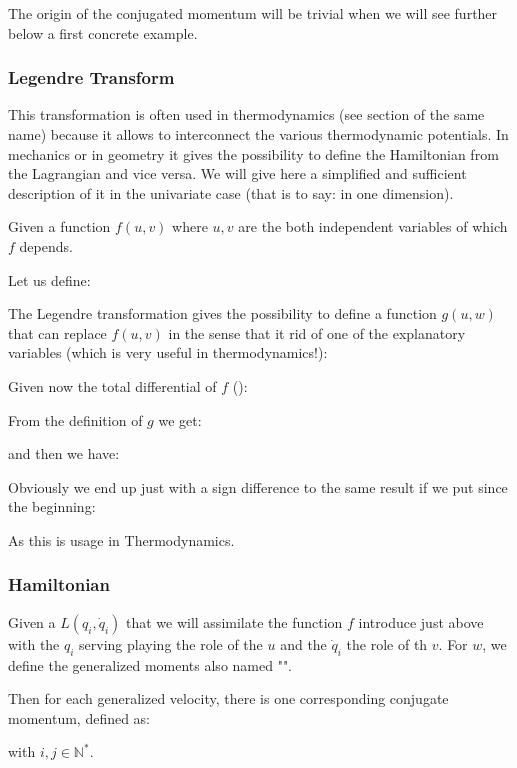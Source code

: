 	\begin{tcolorbox}[title=Remark,colframe=black,arc=10pt]
	The origin of the conjugated momentum will be trivial when we will see further below a first concrete example.
	\end{tcolorbox}	
	
	\subsubsection{Legendre Transform}
	This transformation is often used in thermodynamics (see section of the same name) because it allows to interconnect the various thermodynamic potentials. In mechanics or in geometry it gives the possibility to define the Hamiltonian from the Lagrangian and vice versa. We will give here a simplified and sufficient description of it in the univariate case (that is to say: in one dimension).
	
	Given a function $f (u, v)$ where $u, v$ are the both independent variables of which $f$ depends.
	
	Let us define:
	
	The Legendre transformation gives the possibility to define a function $g(u,w)$ that can replace $f(u,v)$ in the sense that it rid of one of the explanatory variables (which is very useful in thermodynamics!):
	
	Given now the total differential of $f$ ():
	
	From the definition of $g$ we get:
	
	and then we have:
	
	Obviously we end up just with a sign difference to the same result if we put since the beginning:
	
	As this is usage in Thermodynamics.
	
	\subsubsection{Hamiltonian}
	Given a $L(q_i,\dot{q}_i)$ that we will assimilate the function $f$ introduce just above with the $q_i$ serving playing the role of the $u$ and the $\dot{q}_i$ the role of th $v$. For $w$, we define the generalized moments also named "".
	
	Then for each generalized velocity, there is one corresponding conjugate momentum, defined as:
	
	with $i,j\in\mathbb{N}^{*}$.
	
